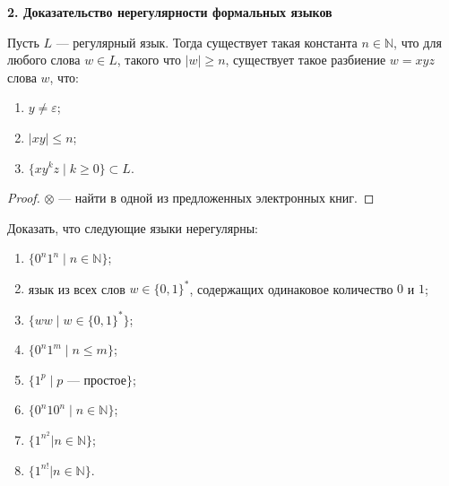 \newpage
\textbf{2. Доказательство нерегулярности формальных языков}
\begin{Thm} Пусть $L$ — регулярный язык.
Тогда существует такая константа $n\in \mathbb N$, что для любого слова $w \in L$,
такого что $|w|\geqslant n$, существует такое разбиение $w=xyz$ слова $w$, что:
\begin{enumerate}
  \item $y \neq \varepsilon$;
  \item $|xy| \leqslant n$;
  \item $\{ xy^kz \mid k \geqslant 0\} \subset L$.
\end{enumerate} 
\end{Thm}
\begin{proof}
${\otimes}$ — найти в одной из предложенных электронных книг.
\end{proof}

Доказать, что следующие языки нерегулярны:
\begin{enumerate}
  \item $\{0^n1^n \mid n \in \mathbb N\}$;
  \item язык из всех слов $w \in \{0,1\}^{\ast}$, содержащих одинаковое
  количество $0$ и $1$;
  \item $\{w w \mid w \in \{0, 1\}^\ast \}$;
  \item $\{0^n1^m \mid n \leqslant m \}$;
  \item $\{1^p \mid \text{$p$ — простое} \}$;
  \item $\{0^n10^n \mid n \in \mathbb N\}$;
  \item $\{1^{n^2} | n \in \mathbb N\}$;
  \item $\{1^{n!} | n \in \mathbb N\}$.
\end{enumerate}